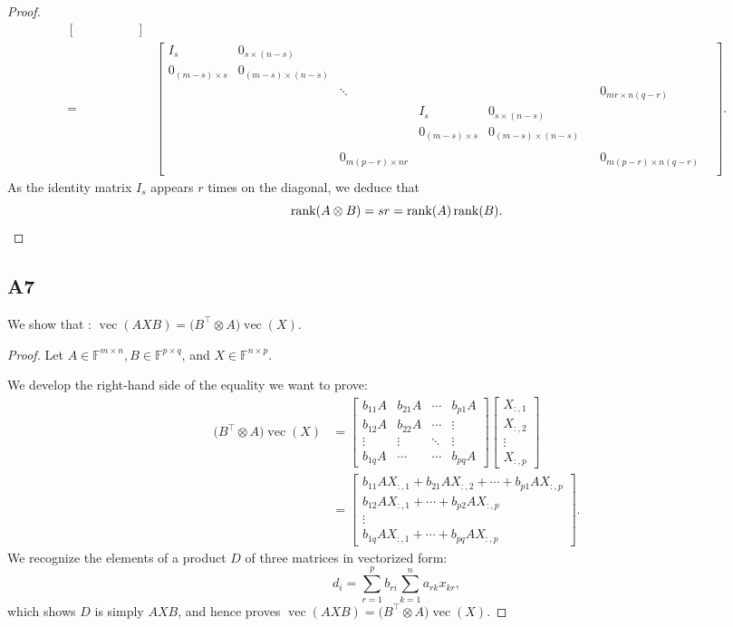 \documentclass[11pt]{article}
\DeclareMathOperator{\rank}{rank}
\DeclareMathOperator{\vect}{vec}
\newcommand{\field}{\mathbb{F}} %
\newcommand{\kp}{\otimes} %
\begin{document}
\begin{proof}
\begin{align*}
\begin{bmatrix}
    & & & & &
    \end{bmatrix}\\
    = &\begin{bmatrix}
    I_s & 0_{s \times (n-s)} & & & & & \\
    0_{(m-s) \times s} & 0_{(m-s) \times (n-s)} & & & & &\\
    & & \ddots & & & & 0_{mr \times n(q-r)} &\\
    & & & I_s & 0_{s \times (n - s)} & & &\\
    & & & 0_{(m-s) \times s} & 0_{(m-s) \times (n-s)} & & &\\
    & & & & & & &\\
    & & 0_{m(p-r) \times nr} & & & & 0_{m(p-r) \times n(q-r)} &\\
    & & & & & & &
    \end{bmatrix}.
\end{align*}
As the identity matrix $I_s$ appears \(r\) times on the diagonal, we deduce that
\[
    \rank(A\kp B)=sr=\rank(A)\rank(B).\qedhere
\]
\end{proof}

\subsection*{A7}
We show that : $\vect(AXB)=\big(B^\top\kp A\big)\vect(X)$.
\begin{proof}
Let \(A \in \field^{m\times n}, B \in \field^{p\times q}\), and \(X \in \field^{n\times p}\).

We develop the right-hand side of the equality we want to prove:
\begin{align*}
    \big(B^\top\kp A\big)\vect(X) &=
    \begin{bmatrix}
    b_{11}A & b_{21}A & \cdots & b_{p1}A\\
    b_{12}A & b_{22}A & \cdots & \vdots \\
    \vdots & \vdots & \ddots & \vdots \\
    b_{1q}A & \cdots & \cdots & b_{pq}A
    \end{bmatrix}
    \begin{bmatrix}
    X_{:,1}\\
    X_{:,2}\\
    \vdots\\
    X_{:,p}
    \end{bmatrix}\\
    &=
    \begin{bmatrix}
    b_{11}AX_{:,1} + b_{21}AX_{:,2} + \cdots + b_{p1}AX_{:,p}\\
    b_{12}AX_{:,1} + \cdots + b_{p2}AX_{:,p}\\
    \vdots \\
    b_{1q}AX_{:,1} + \cdots + b_{pq}AX_{:,p}
    \end{bmatrix}.
\end{align*}
We recognize the elements of a product \(D\) of three matrices in vectorized form:
\[
    d_i=\sum^{p}_{r=1}b_{ri}\sum^{n}_{k=1}a_{rk}x_{kr},
\]
which shows \(D\) is simply \(AXB\), and hence proves \(\vect(AXB)=\big(B^\top\kp A\big)\vect(X)\).
\end{proof}
\end{document}
